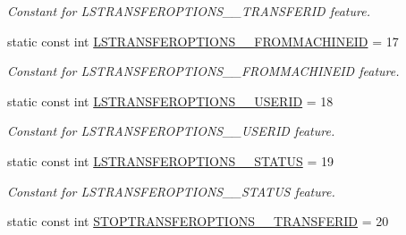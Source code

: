 \begin{DoxyCompactItemize}
\begin{DoxyCompactList}\small\item\em Constant for LSTRANSFEROPTIONS\_\-\_\-TRANSFERID feature. \item\end{DoxyCompactList}\item 
\hypertarget{classFMS__Data_1_1FMS__DataPackage_ad0599298daa6a774ee04f121044fdfe6}{
static const int \hyperlink{classFMS__Data_1_1FMS__DataPackage_ad0599298daa6a774ee04f121044fdfe6}{LSTRANSFEROPTIONS\_\-\_\-FROMMACHINEID} = 17}
\label{classFMS__Data_1_1FMS__DataPackage_ad0599298daa6a774ee04f121044fdfe6}

\begin{DoxyCompactList}\small\item\em Constant for LSTRANSFEROPTIONS\_\-\_\-FROMMACHINEID feature. \item\end{DoxyCompactList}\item 
\hypertarget{classFMS__Data_1_1FMS__DataPackage_af0a4df1f2467af9fefe2ef9f5d6485ba}{
static const int \hyperlink{classFMS__Data_1_1FMS__DataPackage_af0a4df1f2467af9fefe2ef9f5d6485ba}{LSTRANSFEROPTIONS\_\-\_\-USERID} = 18}
\label{classFMS__Data_1_1FMS__DataPackage_af0a4df1f2467af9fefe2ef9f5d6485ba}

\begin{DoxyCompactList}\small\item\em Constant for LSTRANSFEROPTIONS\_\-\_\-USERID feature. \item\end{DoxyCompactList}\item 
\hypertarget{classFMS__Data_1_1FMS__DataPackage_a174bd8e8513ad5ac683d13a26d59292e}{
static const int \hyperlink{classFMS__Data_1_1FMS__DataPackage_a174bd8e8513ad5ac683d13a26d59292e}{LSTRANSFEROPTIONS\_\-\_\-STATUS} = 19}
\label{classFMS__Data_1_1FMS__DataPackage_a174bd8e8513ad5ac683d13a26d59292e}

\begin{DoxyCompactList}\small\item\em Constant for LSTRANSFEROPTIONS\_\-\_\-STATUS feature. \item\end{DoxyCompactList}\item 
\hypertarget{classFMS__Data_1_1FMS__DataPackage_a6bea6178e1a5f1ed4bceb15a815551dd}{
static const int \hyperlink{classFMS__Data_1_1FMS__DataPackage_a6bea6178e1a5f1ed4bceb15a815551dd}{STOPTRANSFEROPTIONS\_\-\_\-TRANSFERID} = 20}
\label{classFMS__Data_1_1FMS__DataPackage_a6bea6178e1a5f1ed4bceb15a815551dd}


\end{DoxyCompactItemize}
